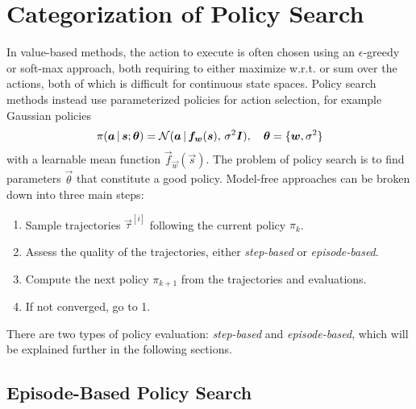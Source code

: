 	\section{Categorization of Policy Search}
		In value-based methods, the action to execute is often chosen using an \(\epsilon\)-greedy or soft-max approach, both requiring to either maximize w.r.t. or sum over the actions, both of which is difficult for continuous state spaces. Policy search methods instead use parameterized policies for action selection, for example Gaussian policies
		\begin{equation*}
			\pi(\bm{a} \,\vert\, \bm{s}; \bm{\theta}) = \mathcal{N}(\bm{a} \,\vert\, \bm{f}_{\bm{w}}(\bm{s}),\, \sigma^2 \bm{I}),\quad \bm{\theta} = \{ \bm{w}, \sigma^2 \}
		\end{equation*}
		with a learnable mean function \( \vec{f}_{\vec{w}}(\vec{s}) \). The problem of policy search is to find parameters \( \vec{\theta} \) that constitute a good policy. Model-free approaches can be broken down into three main steps:
		\begin{enumerate}
			\item {} Sample trajectories \( \vec{\tau}^{[i]} \) following the current policy \( \pi_k \).
			\item {} Assess the quality of the trajectories, either \emph{step-based} or \emph{episode-based}.
			\item {} Compute the next policy \( \pi_{k + 1} \) from the trajectories and evaluations.
			\item If not converged, go to 1.
		\end{enumerate}
		There are two types of policy evaluation: \emph{step-based} and \emph{episode-based}, which will be explained further in the following sections.

		\subsection{Episode-Based Policy Search}
			\label{subsec:episodeBasedPolicySearch}

